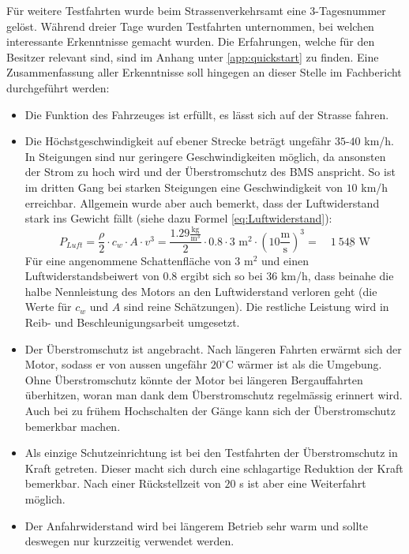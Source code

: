 Für weitere Testfahrten wurde beim Strassenverkehrsamt eine 3-Tagesnummer gelöst. Während dreier Tage wurden Testfahrten unternommen, bei welchen interessante Erkenntnisse gemacht wurden. Die Erfahrungen, welche für den Besitzer relevant sind, sind im Anhang unter \ref{app:quickstart} zu finden. Eine Zusammenfassung aller Erkenntnisse soll hingegen an dieser Stelle im Fachbericht durchgeführt werden: \begin{itemize}
	\item Die Funktion des Fahrzeuges ist erfüllt, es lässt sich auf der Strasse fahren.
	\item Die Höchstgeschwindigkeit auf ebener Strecke beträgt ungefähr $35$-$40$ km/h. In Steigungen sind nur geringere Geschwindigkeiten möglich, da ansonsten der Strom zu hoch wird und der Überstromschutz des BMS anspricht. So ist im dritten Gang bei starken Steigungen eine Geschwindigkeit von $10$ km/h erreichbar. Allgemein wurde aber auch bemerkt, dass der Luftwiderstand stark ins Gewicht fällt (siehe dazu Formel \ref{eq:Luftwiderstand}):
	\begin{equation}
		P_{Luft}=\frac{\rho}{2}\cdot c_w\cdot A\cdot v^3=\frac{1.29\frac{\text{kg}}{\text{m}^3}}{2}\cdot 0.8\cdot 3\text{ m}^2\cdot\left(10\frac{\text{m}}{\text{s}}\right)^3=\quad\underline{1\ 548\text{ W}}
	\label{eq:Luftwiderstand}
	\end{equation}
	Für eine angenommene Schattenfläche von $3$ m$^2$ und einen Luftwiderstandsbeiwert von 0.8 ergibt sich so bei $36$ km/h, dass beinahe die halbe Nennleistung des Motors an den Luftwiderstand verloren geht (die Werte für $c_w$ und $A$ sind reine Schätzungen). Die restliche Leistung wird in Reib- und Beschleunigungsarbeit umgesetzt.
	\item Der Überstromschutz ist angebracht. Nach längeren Fahrten erwärmt sich der Motor, sodass er von aussen ungefähr $20^\circ$C wärmer ist als die Umgebung. Ohne Überstromschutz könnte der Motor bei längeren Bergauffahrten überhitzen, woran man dank dem Überstromschutz regelmässig erinnert wird. Auch bei zu frühem Hochschalten der Gänge kann sich der Überstromschutz bemerkbar machen.
	\item Als einzige Schutzeinrichtung ist bei den Testfahrten der Überstromschutz in Kraft getreten. Dieser macht sich durch eine schlagartige Reduktion der Kraft bemerkbar. Nach einer Rückstellzeit von $20$ s ist aber eine Weiterfahrt möglich.
	\item Der Anfahrwiderstand wird bei längerem Betrieb sehr warm und sollte deswegen nur kurzzeitig verwendet werden.

\end{itemize}
